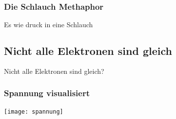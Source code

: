 \begin{frame}
\frametitle{Die Schlauch Methaphor}
\pause
\centering
\Large Es wie druck in eine Schlauch

\end{frame}

\subsection{Nicht alle Elektronen sind gleich}
\begin{frameplain}
\centering\huge Nicht alle Elektronen sind gleich?
\end{frameplain}

\begin{frame}
	\frametitle{Spannung visualisiert}
	\texttt{[image: spannung]}
\end{frame}

